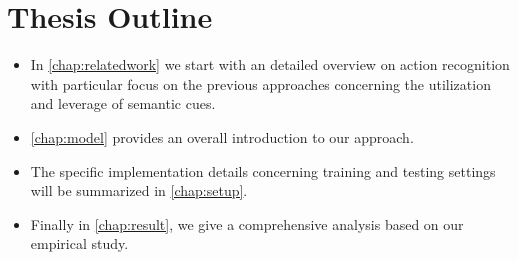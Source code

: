 \section{Thesis Outline}
\begin{itemize}
\item In \autoref{chap:relatedwork} we start with an detailed overview on action recognition with particular focus on the previous approaches concerning the utilization and leverage of semantic cues.
\item \autoref{chap:model} provides an overall introduction to our approach.
\item The specific implementation details concerning training and testing settings will be summarized in \autoref{chap:setup}.
\item Finally in \autoref{chap:result}, we give a comprehensive analysis based on our empirical study.
\end{itemize}

